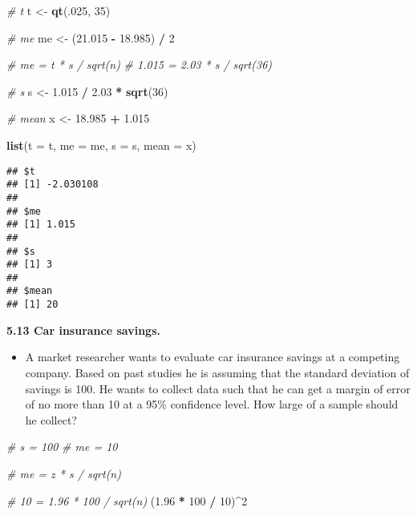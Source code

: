 \documentclass[]{book}
\newenvironment{Shaded}{\begin{snugshade}}{\end{snugshade}}
\newcommand{\CommentTok}[1]{\textcolor[rgb]{0.56,0.35,0.01}{\textit{#1}}}
\newcommand{\DataTypeTok}[1]{\textcolor[rgb]{0.13,0.29,0.53}{#1}}
\newcommand{\DecValTok}[1]{\textcolor[rgb]{0.00,0.00,0.81}{#1}}
\newcommand{\FloatTok}[1]{\textcolor[rgb]{0.00,0.00,0.81}{#1}}
\newcommand{\KeywordTok}[1]{\textcolor[rgb]{0.13,0.29,0.53}{\textbf{#1}}}
\newcommand{\NormalTok}[1]{#1}
\newcommand{\OperatorTok}[1]{\textcolor[rgb]{0.81,0.36,0.00}{\textbf{#1}}}
\newcommand{\StringTok}[1]{\textcolor[rgb]{0.31,0.60,0.02}{#1}}
\providecommand{\tightlist}{%
  \setlength{\itemsep}{0pt}\setlength{\parskip}{0pt}}
\begin{document}
\begin{Shaded}
\begin{Highlighting}[]
\CommentTok{# t}
\NormalTok{t <-}\StringTok{ }\KeywordTok{qt}\NormalTok{(.}\DecValTok{025}\NormalTok{, }\DecValTok{35}\NormalTok{)}

\CommentTok{# me}
\NormalTok{me <-}\StringTok{ }\NormalTok{(}\FloatTok{21.015} \OperatorTok{-}\StringTok{ }\FloatTok{18.985}\NormalTok{) }\OperatorTok{/}\StringTok{ }\DecValTok{2}

\CommentTok{# me = t * s / sqrt(n)}
\CommentTok{# 1.015 = 2.03 * s / sqrt(36)}

\CommentTok{# s}
\NormalTok{s <-}\StringTok{ }\FloatTok{1.015} \OperatorTok{/}\StringTok{ }\FloatTok{2.03} \OperatorTok{*}\StringTok{ }\KeywordTok{sqrt}\NormalTok{(}\DecValTok{36}\NormalTok{)}

\CommentTok{# mean}
\NormalTok{x <-}\StringTok{ }\FloatTok{18.985} \OperatorTok{+}\StringTok{ }\FloatTok{1.015}

\KeywordTok{list}\NormalTok{(}\DataTypeTok{t =}\NormalTok{ t, }\DataTypeTok{me =}\NormalTok{ me, }\DataTypeTok{s =}\NormalTok{ s, }\DataTypeTok{mean =}\NormalTok{ x)}
\end{Highlighting}
\end{Shaded}

\begin{verbatim}
## $t
## [1] -2.030108
## 
## $me
## [1] 1.015
## 
## $s
## [1] 3
## 
## $mean
## [1] 20
\end{verbatim}

\textbf{5.13 Car insurance savings.}

\begin{itemize}
\tightlist
\item
  A market researcher wants to evaluate car insurance savings at a competing company. Based on past studies he is assuming that the standard deviation of savings is 100.
  He wants to collect data such that he can get a margin of error of no more than 10 at a 95\% confidence level. How large of a sample should he collect?
\end{itemize}

\begin{Shaded}
\begin{Highlighting}[]
\CommentTok{# s = 100}
\CommentTok{# me = 10}

\CommentTok{# me = z * s / sqrt(n)}

\CommentTok{# 10 = 1.96 * 100 / sqrt(n)}
\NormalTok{(}\FloatTok{1.96} \OperatorTok{*}\StringTok{ }\DecValTok{100} \OperatorTok{/}\StringTok{ }\DecValTok{10}\NormalTok{)}\OperatorTok{^}\DecValTok{2}
\end{Highlighting}
\end{Shaded}
\end{document}
